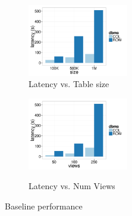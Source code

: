



\begin{figure}[h]
	\centering
	\vspace*{-10pt}
	\begin{subfigure}{0.48\linewidth}
		\centering
		\includegraphics[width=4.4cm] {Images/baselines_by_size.pdf}
		\vspace{-15pt}
		\caption{Latency vs. Table size}
		\label{fig:baseline_size}
	\end{subfigure}
	\begin{subfigure}{0.48\linewidth}
		\centering
		\includegraphics[width=4.4cm] {Images/baselines_by_views.pdf}\
		\vspace{-15pt}
		\caption{Latency vs. Num Views}
		\label{fig:baseline_views}
	\end{subfigure}
	\vspace{-10pt}
	\caption{Baseline performance}
	\label{fig:bank_perf}
		\vspace{-10pt}
\end{figure}

